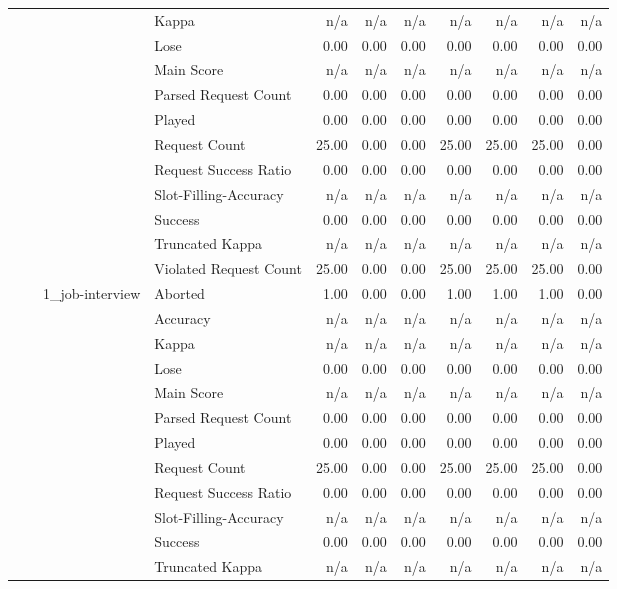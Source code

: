 \begin{tabular}{llllrrrrrrr}
 &  &  & Kappa & n/a & n/a & n/a & n/a & n/a & n/a & n/a \\
 &  &  & Lose & 0.00 & 0.00 & 0.00 & 0.00 & 0.00 & 0.00 & 0.00 \\
 &  &  & Main Score & n/a & n/a & n/a & n/a & n/a & n/a & n/a \\
 &  &  & Parsed Request Count & 0.00 & 0.00 & 0.00 & 0.00 & 0.00 & 0.00 & 0.00 \\
 &  &  & Played & 0.00 & 0.00 & 0.00 & 0.00 & 0.00 & 0.00 & 0.00 \\
 &  &  & Request Count & 25.00 & 0.00 & 0.00 & 25.00 & 25.00 & 25.00 & 0.00 \\
 &  &  & Request Success Ratio & 0.00 & 0.00 & 0.00 & 0.00 & 0.00 & 0.00 & 0.00 \\
 &  &  & Slot-Filling-Accuracy & n/a & n/a & n/a & n/a & n/a & n/a & n/a \\
 &  &  & Success & 0.00 & 0.00 & 0.00 & 0.00 & 0.00 & 0.00 & 0.00 \\
 &  &  & Truncated Kappa & n/a & n/a & n/a & n/a & n/a & n/a & n/a \\
 &  &  & Violated Request Count & 25.00 & 0.00 & 0.00 & 25.00 & 25.00 & 25.00 & 0.00 \\
\cline{3-11}
 &  & \multirow[t]{13}{*}{1_job-interview} & Aborted & 1.00 & 0.00 & 0.00 & 1.00 & 1.00 & 1.00 & 0.00 \\
 &  &  & Accuracy & n/a & n/a & n/a & n/a & n/a & n/a & n/a \\
 &  &  & Kappa & n/a & n/a & n/a & n/a & n/a & n/a & n/a \\
 &  &  & Lose & 0.00 & 0.00 & 0.00 & 0.00 & 0.00 & 0.00 & 0.00 \\
 &  &  & Main Score & n/a & n/a & n/a & n/a & n/a & n/a & n/a \\
 &  &  & Parsed Request Count & 0.00 & 0.00 & 0.00 & 0.00 & 0.00 & 0.00 & 0.00 \\
 &  &  & Played & 0.00 & 0.00 & 0.00 & 0.00 & 0.00 & 0.00 & 0.00 \\
 &  &  & Request Count & 25.00 & 0.00 & 0.00 & 25.00 & 25.00 & 25.00 & 0.00 \\
 &  &  & Request Success Ratio & 0.00 & 0.00 & 0.00 & 0.00 & 0.00 & 0.00 & 0.00 \\
 &  &  & Slot-Filling-Accuracy & n/a & n/a & n/a & n/a & n/a & n/a & n/a \\
 &  &  & Success & 0.00 & 0.00 & 0.00 & 0.00 & 0.00 & 0.00 & 0.00 \\
 &  &  & Truncated Kappa & n/a & n/a & n/a & n/a & n/a & n/a & n/a \\

\end{tabular}
